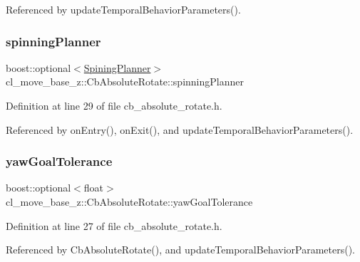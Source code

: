 Referenced by update\+Temporal\+Behavior\+Parameters().

\mbox{\label{classcl__move__base__z_1_1CbAbsoluteRotate_a17d836524599af072cf2e3488e491a91}} 
\subsubsection{\texorpdfstring{spinning\+Planner}{spinningPlanner}}
{\footnotesize\ttfamily boost\+::optional$<$\hyperlink{classcl__move__base__z_1_1CbAbsoluteRotate_ab8d45e43594a3fc6a71c08f07b5dbef0}{Spining\+Planner}$>$ cl\+\_\+move\+\_\+base\+\_\+z\+::\+Cb\+Absolute\+Rotate\+::spinning\+Planner}



Definition at line 29 of file cb\+\_\+absolute\+\_\+rotate.\+h.



Referenced by on\+Entry(), on\+Exit(), and update\+Temporal\+Behavior\+Parameters().

\mbox{\label{classcl__move__base__z_1_1CbAbsoluteRotate_a8d8b5b9c2c821efe101bb07c96c4bdd3}} 
\subsubsection{\texorpdfstring{yaw\+Goal\+Tolerance}{yawGoalTolerance}}
{\footnotesize\ttfamily boost\+::optional$<$float$>$ cl\+\_\+move\+\_\+base\+\_\+z\+::\+Cb\+Absolute\+Rotate\+::yaw\+Goal\+Tolerance}



Definition at line 27 of file cb\+\_\+absolute\+\_\+rotate.\+h.



Referenced by Cb\+Absolute\+Rotate(), and update\+Temporal\+Behavior\+Parameters().



